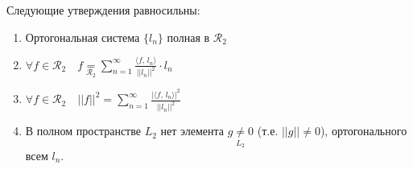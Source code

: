 \begin{theorem*}
    Следующие утверждения равносильны:
    \begin{enumerate}[label=\alph*),leftmargin=*]
        \item Ортогональная система $\{l_n\}$ полная в $\mathcal{R}_2$
        \item $\forall f \in \mathcal{R}_2 \quad f \underset{\mathcal{R}_2}{=} \sum_{n=1}^\infty \frac{\langle f,\, l_n \rangle}{\lvert \lvert l_n \rvert \rvert^2} \cdot l_n$
        \item $\forall f \in \mathcal{R}_2 \quad \lvert \lvert f \rvert \rvert^2 = \sum_{n=1}^\infty \frac{\lvert \langle f,\, l_n \rangle\rvert^2}{\lvert \lvert l_n \rvert \rvert^2}$
        \item В полном пространстве $L_2$ нет элемента $g \underset{L_2}{\neq} 0$ (т.е. $\lvert \lvert g \rvert \rvert \neq 0$), ортогонального всем $l_n$.
    \end{enumerate}
\end{theorem*}
